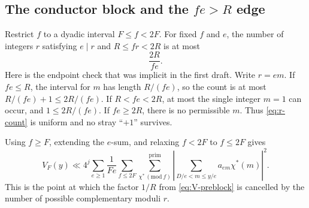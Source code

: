 \subsection{The conductor block and the $fe>R$ edge}

Restrict $f$ to a dyadic interval $F\le f<2F$.  For fixed $f$ and $e$, the
number of integers $r$ satisfying $e\mid r$ and $R\le fr<2R$ is at most
\begin{equation}\label{eq:r-count}
                         \frac{2R}{fe}.
\end{equation}
Here is the endpoint check that was implicit in the first draft.  Write
$r=em$.  If $fe\le R$, the interval for $m$ has length $R/(fe)$, so the count
is at most $R/(fe)+1\le2R/(fe)$.  If $R<fe<2R$, at most the single integer
$m=1$ can occur, and $1\le2R/(fe)$.  If $fe\ge2R$, there is no permissible
$m$.  Thus \cref{eq:r-count} is uniform and no stray ``$+1$'' survives.

Using $f\ge F$, extending the $e$-sum, and relaxing $f<2F$ to $f\le2F$ gives
\begin{equation}\label{eq:VF}
 V_F(y)\ll 4^j\sum_{e\ge1}\frac1{Fe}
 \sum_{f\le2F}\sum_{\chi^*\, (\mathrm{mod}\ f)}^{\mathrm{prim}}
 \left|\sum_{D/e<m\le y/e}a_{em}\chi^*(m)\right|^2.
\end{equation}
This is the point at which the factor $1/R$ from \cref{eq:V-preblock} is
cancelled by the number of possible complementary moduli $r$.
